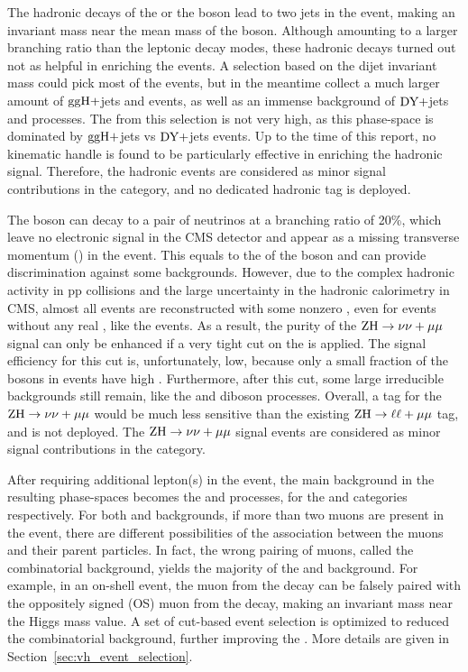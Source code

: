 The hadronic decays of the \PW or the \PZ boson lead to two jets in the event, making an invariant mass near the mean mass of the boson.
Although amounting to a larger branching ratio than the leptonic decay modes, these hadronic decays turned out not as helpful in enriching the \VH events.
A selection based on the dijet invariant mass could pick most of the \VH events, but in the meantime collect a much larger amount of $\mathrm{g}\mathrm{g}\mathrm{H}+$jets and \qqH events, 
as well as an immense background of $\mbox{DY}+$jets and \ttbar processes.
The \SoB from this selection is not very high, as this phase-space is dominated by $\mathrm{g}\mathrm{g}\mathrm{H}+$jets vs $\mbox{DY}+$jets events.
Up to the time of this report, no kinematic handle is found to be particularly effective in enriching the hadronic \VH signal.
Therefore, the hadronic \VH events are considered as minor signal contributions in the \ggH category, 
and no dedicated \VH hadronic tag is deployed.

The \PZ boson can decay to a pair of neutrinos at a branching ratio of 20\%, 
which leave no electronic signal in the CMS detector and appear as a missing transverse momentum (\MET) in the event.
This \MET equals to the \pt of the \PZ boson and can provide discrimination against some backgrounds.
However, due to the complex hadronic activity in pp collisions and the large uncertainty in the hadronic calorimetry in CMS, 
almost all events are reconstructed with some nonzero \MET, even for events without any real \MET, like the \DY events.
As a result, the purity of the $\mathrm{Z}\mathrm{H} \to \nu\nu+\mu\mu$ signal can only be enhanced if a very tight cut on the \MET is applied.
The signal efficiency for this cut is, unfortunately, low, because only a small fraction of the \PZ bosons in \ZH events have high \pt.
Furthermore, after this cut, some large irreducible backgrounds still remain, like the \ttbar and diboson processes.
Overall, a tag for the $\mathrm{Z}\mathrm{H} \to \nu\nu+\mu\mu$ would be much less sensitive than the existing $\mathrm{Z}\mathrm{H} \to \ell\ell+\mu\mu$ tag, and is not deployed.
The $\mathrm{Z}\mathrm{H} \to \nu\nu+\mu\mu$ signal events are considered as minor signal contributions in the \ggH category.

After requiring additional lepton(s) in the event, the main background in the resulting \VH phase-spaces becomes the \WZ and \ZZ processes, for the \WH and \ZH categories respectively.
For both \WZ and \ZZ backgrounds, if more than two muons are present in the event, 
there are different possibilities of the association between the muons and their parent particles.
In fact, the wrong pairing of muons, called the combinatorial background, yields the majority of the \WZ and \ZZ background.
For example, in an on-shell \WZ event, the muon from the \PW decay can be falsely paired with the oppositely signed (OS) muon from the \PZ decay, 
making an invariant mass near the Higgs mass value.
A set of cut-based event selection is optimized to reduced the combinatorial background, further improving the \SoB. 
More details are given in Section~\ref{sec:vh_event_selection}.

